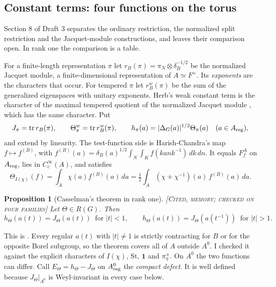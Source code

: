 \documentclass[12pt,letterpaper]{amsart}
\numberwithin{equation}{section}
\newtheorem{proposition}[theorem]{Proposition}
\theoremstyle{definition}
\theoremstyle{remark}
\newcommand{\St}{\mathrm{St}}
\newcommand{\triv}{\mathbf 1}
\newcommand{\tr}{\operatorname{tr}}
\newcommand{\status}[1]{\textup{[\textsc{#1}]}}
\begin{document}
\subsection{Constant terms: four functions on the torus}\label{sub:four}
Section 8 of Draft 3 separates the ordinary restriction, the normalized split restriction and the Jacquet-module constructions, and leaves their comparison open. In rank one the comparison is a table.

For a finite-length representation $\pi$ let $r_B(\pi)=\pi_N\otimes\delta_B^{-1/2}$ be the normalized Jacquet module, a finite-dimensional representation of $A\simeq F^\times$. Its \emph{exponents} are the characters that occur. For tempered $\pi$ let $r_B^w(\pi)$ be the sum of the generalized eigenspaces with unitary exponents. Herb's weak constant term is the character of the maximal tempered quotient of the normalized Jacquet module \cite[Section 2]{He94}, which has the same character. Put
\[
J_\pi=\tr r_B(\pi),\qquad \Theta_\pi^w=\tr r_B^w(\pi),\qquad h_\pi(a)=|\Delta_G(a)|^{1/2}\Theta_\pi(a)\quad(a\in A_{\rm reg}),
\]
and extend by linearity. The test-function side is Harish-Chandra's map $f\mapsto f^{(B)}$, with $f^{(B)}(a)=\delta_B(a)^{1/2}\int_N\int_K f(kank^{-1})\,dk\,dn$. It equals $F_f^A$ on $A_{\rm reg}$, lies in $C_c^\infty(A)$, and satisfies
\begin{equation}\label{eq:adj}
\Theta_{I(\chi)}(f)=\int_A\chi(a)f^{(B)}(a)\,da=\tfrac12\int_A(\chi+\chi^{-1})(a)\,f^{(B)}(a)\,da .
\end{equation}

\begin{proposition}[Casselman's theorem in rank one]\label{prop:cass}
\status{Cited, memory; checked on four families} Let $\Theta\in R(G)$. Then\[h_\Theta(a(t))=J_\Theta(a(t))\ \text{ for }|t|<1,\qquad h_\Theta(a(t))=J_\Theta(a(t^{-1}))\ \text{ for }|t|>1 .\]
\end{proposition}
This is \cite{Ca77}. Every regular $a(t)$ with $|t|\ne1$ is strictly contracting for $B$ or for the opposite Borel subgroup, so the theorem covers all of $A$ outside $A^0$. I checked it against the explicit characters of $I(\chi)$, $\St$, $\triv$ and $\pi_\eta^\pm$. On $A^0$ the two functions can differ. Call $E_\Theta=h_\Theta-J_\Theta$ on $A^0_{\rm reg}$ the \emph{compact defect}. It is well defined because $J_\Theta|_{A^0}$ is Weyl-invariant in every case below.
\end{document}
